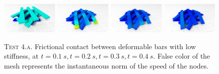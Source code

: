 \documentclass[AMA,STIX1COL]{WileyNJD-v2}
\begin{document}
\begin{figure}[!tbp]
  \centering
	\includegraphics[width=0.24\textwidth]{pics/ribbons_3_20.png}
  \includegraphics[width=0.24\textwidth]{pics/ribbons_3_40.png}
	\includegraphics[width=0.24\textwidth]{pics/ribbons_3_60.png}
	\includegraphics[width=0.24\textwidth]{pics/ribbons_3_80.png}
	\hfill
  \caption{\textsc{Test 4.a}. Frictional contact between deformable bars with low stiffness, at $t=\SI{0.1}{s},t=\SI{0.2}{s},t=\SI{0.3}{s},t=\SI{0.4}{s}$. False color of the mesh represents the instantaneous norm of the speed of the nodes.}
	\label{fig:ribbons_1}
\end{figure}

\end{document}
